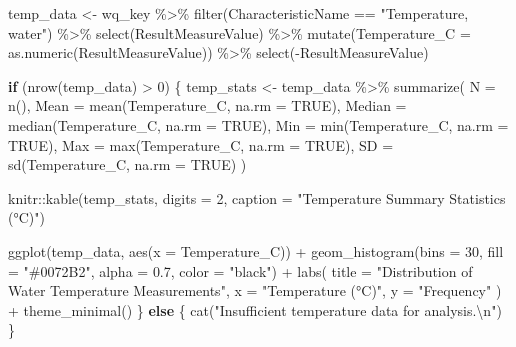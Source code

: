 \documentclass[
  letterpaper,
]{scrbook}
\newenvironment{Shaded}{\begin{snugshade}}{\end{snugshade}}
\newcommand{\AttributeTok}[1]{\textcolor[rgb]{0.40,0.45,0.13}{#1}}
\newcommand{\ConstantTok}[1]{\textcolor[rgb]{0.56,0.35,0.01}{#1}}
\newcommand{\ControlFlowTok}[1]{\textcolor[rgb]{0.00,0.23,0.31}{\textbf{#1}}}
\newcommand{\DecValTok}[1]{\textcolor[rgb]{0.68,0.00,0.00}{#1}}
\newcommand{\FloatTok}[1]{\textcolor[rgb]{0.68,0.00,0.00}{#1}}
\newcommand{\FunctionTok}[1]{\textcolor[rgb]{0.28,0.35,0.67}{#1}}
\newcommand{\NormalTok}[1]{\textcolor[rgb]{0.00,0.23,0.31}{#1}}
\newcommand{\OtherTok}[1]{\textcolor[rgb]{0.00,0.23,0.31}{#1}}
\newcommand{\SpecialCharTok}[1]{\textcolor[rgb]{0.37,0.37,0.37}{#1}}
\newcommand{\StringTok}[1]{\textcolor[rgb]{0.13,0.47,0.30}{#1}}
\begin{document}
\begin{Shaded}
\begin{Highlighting}[]
\NormalTok{temp\_data }\OtherTok{\textless{}{-}}\NormalTok{ wq\_key }\SpecialCharTok{\%\textgreater{}\%}
  \FunctionTok{filter}\NormalTok{(CharacteristicName }\SpecialCharTok{==} \StringTok{"Temperature, water"}\NormalTok{) }\SpecialCharTok{\%\textgreater{}\%}
  \FunctionTok{select}\NormalTok{(ResultMeasureValue) }\SpecialCharTok{\%\textgreater{}\%}
  \FunctionTok{mutate}\NormalTok{(}\AttributeTok{Temperature\_C =} \FunctionTok{as.numeric}\NormalTok{(ResultMeasureValue)) }\SpecialCharTok{\%\textgreater{}\%}
  \FunctionTok{select}\NormalTok{(}\SpecialCharTok{{-}}\NormalTok{ResultMeasureValue)}

\ControlFlowTok{if}\NormalTok{ (}\FunctionTok{nrow}\NormalTok{(temp\_data) }\SpecialCharTok{\textgreater{}} \DecValTok{0}\NormalTok{) \{}
\NormalTok{  temp\_stats }\OtherTok{\textless{}{-}}\NormalTok{ temp\_data }\SpecialCharTok{\%\textgreater{}\%}
    \FunctionTok{summarize}\NormalTok{(}
      \AttributeTok{N =} \FunctionTok{n}\NormalTok{(),}
      \AttributeTok{Mean =} \FunctionTok{mean}\NormalTok{(Temperature\_C, }\AttributeTok{na.rm =} \ConstantTok{TRUE}\NormalTok{),}
      \AttributeTok{Median =} \FunctionTok{median}\NormalTok{(Temperature\_C, }\AttributeTok{na.rm =} \ConstantTok{TRUE}\NormalTok{),}
      \AttributeTok{Min =} \FunctionTok{min}\NormalTok{(Temperature\_C, }\AttributeTok{na.rm =} \ConstantTok{TRUE}\NormalTok{),}
      \AttributeTok{Max =} \FunctionTok{max}\NormalTok{(Temperature\_C, }\AttributeTok{na.rm =} \ConstantTok{TRUE}\NormalTok{),}
      \AttributeTok{SD =} \FunctionTok{sd}\NormalTok{(Temperature\_C, }\AttributeTok{na.rm =} \ConstantTok{TRUE}\NormalTok{)}
\NormalTok{    )}
  
\NormalTok{  knitr}\SpecialCharTok{::}\FunctionTok{kable}\NormalTok{(temp\_stats, }\AttributeTok{digits =} \DecValTok{2}\NormalTok{, }\AttributeTok{caption =} \StringTok{"Temperature Summary Statistics (°C)"}\NormalTok{)}
  
  \FunctionTok{ggplot}\NormalTok{(temp\_data, }\FunctionTok{aes}\NormalTok{(}\AttributeTok{x =}\NormalTok{ Temperature\_C)) }\SpecialCharTok{+}
    \FunctionTok{geom\_histogram}\NormalTok{(}\AttributeTok{bins =} \DecValTok{30}\NormalTok{, }\AttributeTok{fill =} \StringTok{"\#0072B2"}\NormalTok{, }\AttributeTok{alpha =} \FloatTok{0.7}\NormalTok{, }\AttributeTok{color =} \StringTok{"black"}\NormalTok{) }\SpecialCharTok{+}
    \FunctionTok{labs}\NormalTok{(}
      \AttributeTok{title =} \StringTok{"Distribution of Water Temperature Measurements"}\NormalTok{,}
      \AttributeTok{x =} \StringTok{"Temperature (°C)"}\NormalTok{,}
      \AttributeTok{y =} \StringTok{"Frequency"}
\NormalTok{    ) }\SpecialCharTok{+}
    \FunctionTok{theme\_minimal}\NormalTok{()}
\NormalTok{\} }\ControlFlowTok{else}\NormalTok{ \{}
  \FunctionTok{cat}\NormalTok{(}\StringTok{"Insufficient temperature data for analysis.}\SpecialCharTok{\textbackslash{}n}\StringTok{"}\NormalTok{)}
\NormalTok{\}}
\end{Highlighting}
\end{Shaded}
\end{document}
